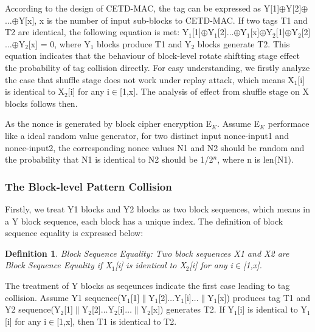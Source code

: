\documentclass{article}
\newtheorem{defination}{Definition}[section]
\begin{document}
According to the design of CETD-MAC, the tag can be expressed as Y[1]$\oplus$Y[2]$\oplus$$\ldots$$\oplus$Y[x], x is the number of input sub-blocks to CETD-MAC. If two tags T1 and T2 are identical, the following equation is met:
Y$_1$[1]$\oplus$Y$_1$[2]$\ldots$$\oplus$Y$_1$[x]$\oplus$Y$_2$[1]$\oplus$Y$_2$[2]$\ldots$$\oplus$Y$_2$[x] = 0, where Y$_1$ blocks produce T1 and Y$_2$ blocks generate T2. This equation indicates that the behaviour of block-level rotate shiftting stage effect the probability of tag collision directly. For easy understanding, we firstly analyze the case that shuffle stage does not work under replay attack, which means X$_1$[i] is identical to X$_2$[i] for any i$\in$[1,x]. The analysis of effect from shuffle stage on X blocks follows then.

As the nonce is generated by block cipher encryption E$_K$. Assume E$_K$ performace like a ideal random value generator, for two distinct input nonce-input1 and nonce-input2, the corresponding nonce values N1 and N2 should be random and the probability that N1 is identical to N2 should be 1/2$^n$, where n is len(N1). 

\subsubsection{The Block-level Pattern Collision}
Firstly, we treat Y1 blocks and Y2 blocks as two block sequences, which means in a Y block sequence, each block has a unique index. The definition of block sequence equality is expressed below:
\begin{defination}
Block Sequence Equality: Two block sequences X1 and X2 are Block Sequence Equality if X$_1$[i] is identical to X$_2$[i] for any i$\in$[1,x].
\end{defination}

The treatment of Y blocks as seqeunces indicate the first case leading to tag collision.
Assume Y1 sequence(Y$_1$[1]$\|$Y$_1$[2]$\ldots$Y$_1$[i]$\ldots$$\|$Y$_1$[x]) produces tag T1 and Y2 sequence(Y$_2$[1]$\|$Y$_2$[2]$\ldots$Y$_2$[i]$\ldots$$\|$Y$_2$[x]) generates T2. If Y$_1$[i] is identical to Y$_1$[i] for any i$\in$[1,x], then T1 is identical to T2. 
\end{document}
